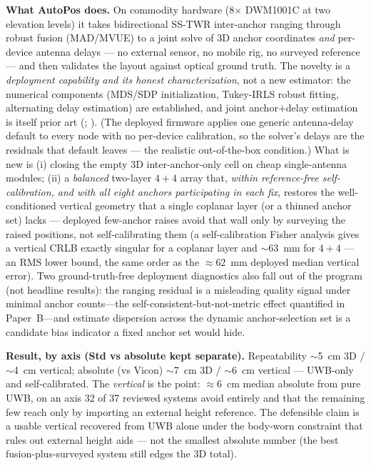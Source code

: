 \documentclass[10pt,a4paper]{article}
\begin{document}
\textbf{What AutoPos does.} On commodity hardware (8$\times$ DWM1001C at two elevation levels) it
takes bidirectional SS-TWR inter-anchor ranging through robust fusion (MAD/MVUE) to a joint solve of
3D anchor coordinates \emph{and} per-device antenna delays --- no external sensor, no mobile rig, no
surveyed reference --- and then validates the layout against optical ground truth. The novelty is a
\emph{deployment capability and its honest characterization}, not a new estimator: the numerical
components (MDS/SDP initialization, Tukey-IRLS robust fitting, alternating delay estimation) are
established, and joint anchor$+$delay estimation is itself prior art
(\citealp{de_preter_2019}; \citealp{shah_2022}). (The deployed firmware applies one generic
antenna-delay default to every node with no per-device calibration, so the solver's delays are the
residuals that default leaves --- the realistic out-of-the-box condition.) What is new is (i) closing the empty 3D
inter-anchor-only cell on cheap single-antenna modules; (ii) a \emph{balanced} two-layer $4{+}4$
array that, \emph{within reference-free self-calibration, and with all eight anchors participating in each fix}, restores the well-conditioned vertical geometry that
a single coplanar layer (or a thinned anchor set) lacks --- deployed few-anchor raises avoid that wall only
by surveying the raised positions, not self-calibrating them (a self-calibration Fisher analysis gives
a vertical CRLB exactly singular for a coplanar layer and $\sim$63~mm for $4{+}4$ --- an RMS lower bound, the same order as the ${\approx}62$~mm
deployed median vertical error). Two ground-truth-free deployment diagnostics also fall out of the
program (not headline results): the ranging residual is a misleading quality signal under minimal
anchor counts---the self-consistent-but-not-metric effect quantified in Paper~B---and estimate
dispersion across the dynamic anchor-selection set is a candidate bias indicator a fixed anchor set
would hide.

\textbf{Result, by axis (Std vs absolute kept separate).} Repeatability $\sim$5~cm 3D / $\sim$4~cm
vertical; absolute (vs Vicon) $\sim$7~cm 3D / $\sim$6~cm vertical --- UWB-only and self-calibrated.
The \emph{vertical} is the point: ${\approx}6$~cm median absolute from pure UWB, on an axis 32 of 37 reviewed systems
avoid entirely and that the remaining few reach only by importing an external height reference. The defensible claim is a usable vertical recovered from UWB alone under the
body-worn constraint that rules out external height aids --- not the smallest absolute number (the
best fusion-plus-surveyed system still edges the 3D total).
\end{document}
